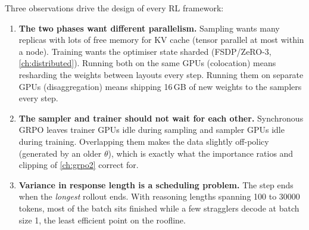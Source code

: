 Three observations drive the design of every RL framework:
\begin{enumerate}
\item \textbf{The two phases want different parallelism.} Sampling wants many replicas
with lots of free memory for KV cache (tensor parallel at most within a node). Training wants the
optimiser state sharded (FSDP/ZeRO-3, \cref{ch:distributed}). Running both on the same GPUs
(colocation) means resharding the weights between layouts every step. Running them on
separate GPUs (disaggregation) means shipping 16\,GB of new weights to the samplers every
step.
\item \textbf{The sampler and trainer should not wait for each other.} Synchronous GRPO
leaves trainer GPUs idle during sampling and sampler GPUs idle during training. Overlapping
them makes the data slightly off-policy (generated by an older $\theta$), which is
exactly what the importance ratios and clipping of \cref{ch:grpo2} correct for.
\item \textbf{Variance in response length is a scheduling problem.} The step ends when the
\emph{longest} rollout ends. With reasoning lengths spanning 100 to \num{30000} tokens, most
of the batch sits finished while a few stragglers decode at batch size 1, the least
efficient point on the roofline.
\end{enumerate}

